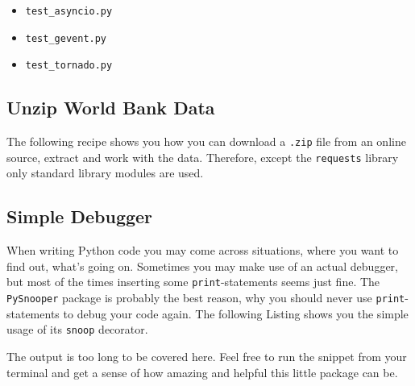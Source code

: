 \begin{itemize}
    \item \lstinline{test_asyncio.py}
    \item \lstinline{test_gevent.py}
    \item \lstinline{test_tornado.py}
\end{itemize}


\subsection{Unzip World Bank Data}

The following recipe shows you how you can download a \lstinline{.zip} file from an online source, extract and work with the data.
Therefore, except the \lstinline{requests} library only standard library modules are used.




\subsection{Simple Debugger}

When writing Python code you may come across situations, where you want to find out, what's going on.
Sometimes you may make use of an actual debugger, but most of the times inserting some \lstinline{print}-statements seems just fine.
The \lstinline{PySnooper} package is probably the best reason, why you should never use \lstinline{print}-statements to debug your code again.
The following Listing shows you the simple usage of its \lstinline{snoop} decorator.



The output is too long to be covered here.
Feel free to run the snippet from your terminal and get a sense of how amazing and helpful this little package can be.
